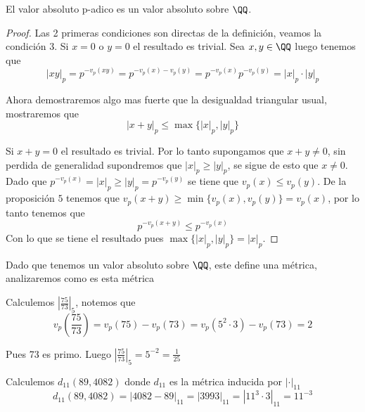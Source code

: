\documentclass[a4paper,oneside,10.5pt]{USMArt}
\begin{document}
\begin{prop}
  El valor absoluto p-adico es un valor absoluto sobre $\QQ$.
\end{prop}

\begin{proof}
  Las 2 primeras condiciones son directas de la definici\'on, veamos la condición $3$.
  Si $x = 0$ o $y = 0$ el resultado es trivial. Sea $x, y \in \QQ$ luego tenemos que
  \begin{equation*}
    |xy|_{p} = p^{-v_{p}(xy)} = p^{-v_{p}(x) - v_{p}(y)} = p^{-v_{p}(x)}p^{-v_{p}(y)} = |x|_{p} \cdot |y|_{p}
  \end{equation*}

  Ahora demostraremos algo mas fuerte que la desigualdad triangular usual, mostraremos que
  \begin{equation*}
    |x + y|_{p} \leq \max \{|x|_{p}, |y|_{p}\}
  \end{equation*}

  Si $x + y = 0$ el resultado es trivial. Por lo tanto supongamos que $x + y \neq 0$, sin perdida de generalidad
  supondremos que $|x|_{p} \geq |y|_{p}$, se sigue de esto que $x \neq 0$. Dado que
  $p^{-v_{p}(x)} = |x|_{p} \geq |y|_{p} = p^{-v_{p}(y)}$ se tiene que $v_{p}(x) \leq v_{p}(y)$. De la proposición $5$
  tenemos que $v_{p}(x + y) \geq \min \{v_{p}(x), v_{p}(y)\} = v_{p}(x)$, por lo tanto tenemos que
  \begin{equation*}
    p^{-v_{p}(x + y)} \leq p^{-v_{p}(x)}
  \end{equation*}
  Con lo que se tiene el resultado pues $\max \{|x|_{p}, |y|_{p}\} = |x|_{p}$.
\end{proof}

\begin{obs}
  Dado que tenemos un valor absoluto sobre $\QQ$, este define una métrica, analizaremos como es esta métrica
\end{obs}

\begin{ejemplo}
  Calculemos $|\frac{75}{73}|_{5}$, notemos que
  \begin{equation*}
    v_{p}(\frac{75}{73}) = v_{p}(75) - v_{p}(73) = v_{p}(5^{2}\cdot3) - v_{p}(73) = 2
  \end{equation*}

  Pues 73 es primo. Luego $|\frac{75}{73}|_{5} = 5^{-2} = \frac{1}{25}$
\end{ejemplo}

\begin{ejemplo}
  Calculemos $d_{11}(89, 4082)$ donde $d_{11}$ es la métrica inducida por $|\cdot|_{11}$
  \begin{equation*}
    d_{11}(89, 4082) = |4082 - 89|_{11} = |3993|_{11} = |11^{3} \cdot 3|_{11} = 11^{-3}
  \end{equation*}
\end{ejemplo}
\end{document}

